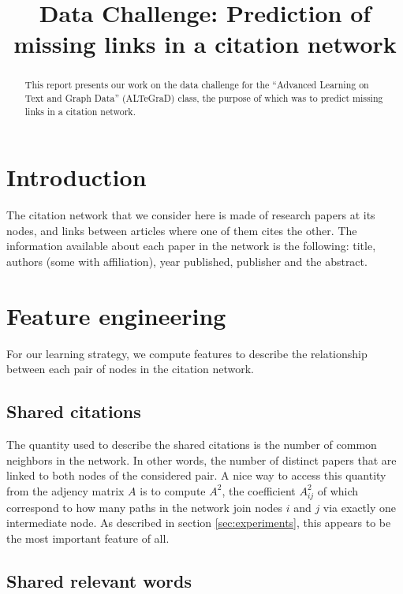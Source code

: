 \documentclass{article}
\title{Data Challenge: Prediction of missing links in a citation network}
\begin{document}
\ninept

\maketitle

\begin{abstract}
This report presents our work on the data challenge for the \enquote{Advanced Learning on Text and Graph Data} (ALTeGraD) class, the purpose of which was to predict missing links in a citation network.
\end{abstract}


\section{Introduction}

The citation network that we consider here is made of research papers at its nodes, and links between articles where one of them cites the other.
The information available about each paper in the network is the following: title, authors (some with affiliation), year published, publisher and the abstract.

\section{Feature engineering}

For our learning strategy, we compute features to describe the relationship between each pair of nodes in the citation network.

\subsection{Shared citations}

The quantity used to describe the shared citations is the number of common neighbors in the network. In other words, the number of distinct papers that are linked to both nodes of the considered pair. A nice way to access this quantity from the adjency matrix $A$ is to compute $A^2$, the coefficient $A^2_{ij}$ of which correspond to how many paths in the network join nodes $i$ and $j$ via exactly one intermediate node.
As described in section \ref{sec:experiments}, this appears to be the most important feature of all.

\subsection{Shared relevant words}
\label{sec:shared_words}
\end{document}
